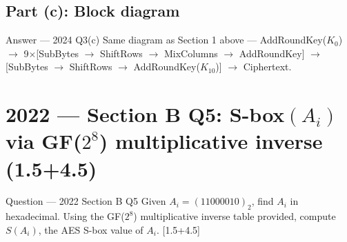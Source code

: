 \documentclass[12pt,a4paper]{article}
\begin{document}
\subsection{Part (c): Block diagram}
\begin{solbox}{Answer --- 2024 Q3(c)}
Same diagram as Section 1 above --- AddRoundKey($K_0$) $\to$ 9$\times$[SubBytes $\to$ ShiftRows $\to$ MixColumns $\to$ AddRoundKey] $\to$ [SubBytes $\to$ ShiftRows $\to$ AddRoundKey($K_{10}$)] $\to$ Ciphertext.
\end{solbox}

\section{2022 --- Section B Q5: S-box$(A_i)$ via GF($2^8$) multiplicative inverse (1.5+4.5)}

\begin{qbox}{Question --- 2022 Section B Q5}
Given $A_i = (11000010)_2$, find $A_i$ in hexadecimal. Using the GF($2^8$) multiplicative inverse table provided, compute $S(A_i)$, the AES S-box value of $A_i$. \hfill [1.5+4.5]
\end{qbox}
\end{document}
